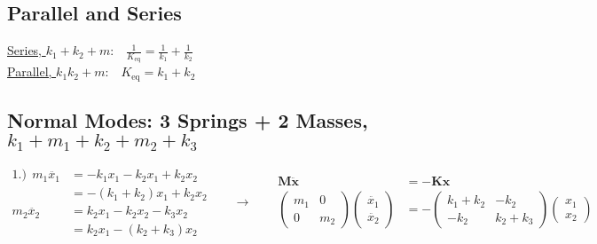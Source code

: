\documentclass[12pt]{article}
\begin{document}
\newpage
\subsection{Parallel and Series}

\vspace{10pt}\noindent
\underline{Series, \(k_1 {\scriptstyle+} k_2 {\scriptstyle+} m\)}:\ \
    \(\displaystyle\frac{1}{K_\text{eq}} = \frac{1}{k_1} + \frac{1}{k_2}\)\\[10pt]
\underline{Parallel, \(k_1 k_2 {\scriptstyle+} m\)}:\ \ \(K_\text{eq} = k_1 + k_2\)

\vspace{15pt}
\subsection{Normal Modes: 3 Springs + 2 Masses, 
    \(k_1 {\scriptstyle+} m_1 {\scriptstyle+} k_2 {\scriptstyle+} m_2 {\scriptstyle+} k_3\)}

\vspace{15pt}\noindent
\(\begin{aligned}    
    1.)\ \ m_1\ddot{x_1} &= -k_1 x_1 - k_2 x_1 + k_2 x_2 \\[5pt]
        &= -(k_1 + k_2) x_1 + k_2 x_2\\[15pt]
    m_2\ddot{x_2} &= k_2 x_1 - k_2 x_2 - k_3 x_2  \\[5pt]
        &= k_2 x_1 - (k_2 + k_3) x_2
\end{aligned}
\hspace{20pt}
\rightarrow
\hspace{20pt}
\begin{aligned}
    \mathbf{M\ddot{x}} &= \mathbf{-Kx}\\[10pt]
    \left(\begin{matrix}
        m_1 & 0 \\
        0 & m_2
    \end{matrix}\right)
    \left(\begin{matrix}
        \ddot{x_1}\\
        \ddot{x_2}
    \end{matrix}\right) &= 
    -\left(\begin{matrix}
        k_1 + k_2 & -k_2\\
        -k_2 & k_2 + k_3
    \end{matrix}\right)
    \left(\begin{matrix}
        x_1\\
        x_2
    \end{matrix}\right)
\end{aligned}\)
\end{document}
